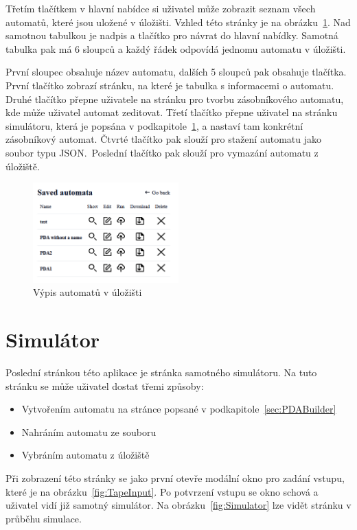 Třetím tlačítkem v hlavní nabídce si uživatel může zobrazit seznam všech automatů, které jsou uložené v úložišti. Vzhled této stránky je na obrázku~\ref{fig:Storage}. Nad samotnou tabulkou je nadpis a tlačítko pro návrat do hlavní nabídky. Samotná tabulka pak má 6 sloupců a každý řádek odpovídá jednomu automatu v úložišti.

První sloupec obsahuje název automatu, dalších 5 sloupců pak obsahuje tlačítka. První tlačítko zobrazí stránku, na které je tabulka s informacemi o automatu. Druhé tlačítko přepne uživatele na stránku pro tvorbu zásobníkového automatu, kde může uživatel automat zeditovat. Třetí tlačítko přepne uživatel na stránku simulátoru, která je popsána v podkapitole~\ref{sec:SimulatorPage}, a nastaví tam konkrétní zásobníkový automat. Čtvrté tlačítko pak slouží pro stažení automatu jako soubor typu JSON.\ Poslední tlačítko pak slouží pro vymazání automatu z úložiště.

\begin{figure}[h]
    \centering
    \includegraphics[width=0.5\textwidth]{Figures/PrntScrn_UI_Storage.png}
    \caption{Výpis automatů v úložišti}\label{fig:Storage}
\end{figure}

\section{Simulátor}\label{sec:SimulatorPage}

Poslední stránkou této aplikace je stránka samotného simulátoru. Na tuto stránku se může uživatel dostat třemi způsoby:

\begin{itemize}
    \item Vytvořením automatu na stránce popsané v podkapitole~\ref{sec:PDABuilder}
    \item Nahráním automatu ze souboru
    \item Vybráním automatu z úložiště
\end{itemize}

Při zobrazení této stránky se jako první otevře modální okno pro zadání vstupu, které je na obrázku~\ref{fig:TapeInput}. Po potvrzení vstupu se okno schová a uživatel vidí již samotný simulátor. Na obrázku~\ref{fig:Simulator} lze vidět stránku v průběhu simulace.

